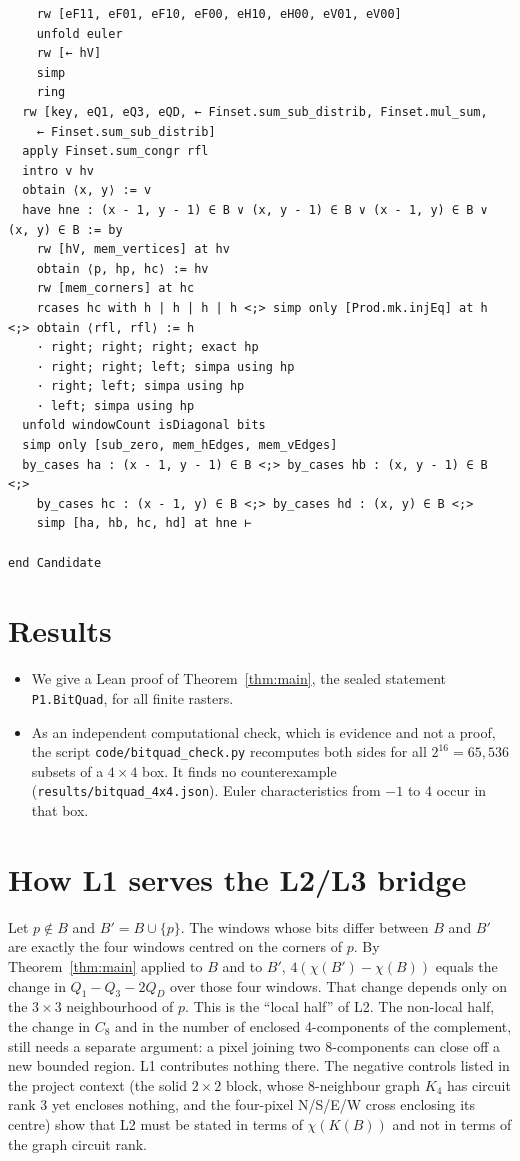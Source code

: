 \documentclass[11pt]{article}
\theoremstyle{definition}
\theoremstyle{remark}
\begin{document}
\begin{lstlisting}
    rw [eF11, eF01, eF10, eF00, eH10, eH00, eV01, eV00]
    unfold euler
    rw [← hV]
    simp
    ring
  rw [key, eQ1, eQ3, eQD, ← Finset.sum_sub_distrib, Finset.mul_sum,
    ← Finset.sum_sub_distrib]
  apply Finset.sum_congr rfl
  intro v hv
  obtain ⟨x, y⟩ := v
  have hne : (x - 1, y - 1) ∈ B ∨ (x, y - 1) ∈ B ∨ (x - 1, y) ∈ B ∨ (x, y) ∈ B := by
    rw [hV, mem_vertices] at hv
    obtain ⟨p, hp, hc⟩ := hv
    rw [mem_corners] at hc
    rcases hc with h | h | h | h <;> simp only [Prod.mk.injEq] at h <;> obtain ⟨rfl, rfl⟩ := h
    · right; right; right; exact hp
    · right; right; left; simpa using hp
    · right; left; simpa using hp
    · left; simpa using hp
  unfold windowCount isDiagonal bits
  simp only [sub_zero, mem_hEdges, mem_vEdges]
  by_cases ha : (x - 1, y - 1) ∈ B <;> by_cases hb : (x, y - 1) ∈ B <;>
    by_cases hc : (x - 1, y) ∈ B <;> by_cases hd : (x, y) ∈ B <;>
    simp [ha, hb, hc, hd] at hne ⊢

end Candidate
\end{lstlisting}

\section{Results}

\begin{itemize}
\item We give a Lean proof of Theorem~\ref{thm:main}, the sealed statement
  \texttt{P1.BitQuad}, for all finite rasters.
\item As an independent computational check, which is evidence and not a
  proof, the script \texttt{code/bitquad\_check.py} recomputes both sides for
  all $2^{16}=65{,}536$ subsets of a $4\times4$ box. It finds no
  counterexample (\texttt{results/bitquad\_4x4.json}). Euler characteristics
  from $-1$ to $4$ occur in that box.
\end{itemize}

\section{How L1 serves the L2/L3 bridge}\label{sec:l1end}

Let $p\notin B$ and $B'=B\cup\{p\}$. The windows whose bits differ between $B$
and $B'$ are exactly the four windows centred on the corners of $p$. By
Theorem~\ref{thm:main} applied to $B$ and to $B'$, $4(\chi(B')-\chi(B))$ equals
the change in $Q_1-Q_3-2Q_D$ over those four windows. That change depends only on the
$3\times3$ neighbourhood of $p$. This is the ``local half'' of L2. The non-local
half, the change in $C_8$ and in the number of enclosed 4-components of the
complement, still needs a separate argument: a pixel joining two
8-components can close off a new bounded region. L1 contributes nothing there.
The negative controls listed in the project context (the solid $2\times2$ block,
whose 8-neighbour graph $K_4$ has circuit rank 3 yet encloses nothing, and the
four-pixel N/S/E/W cross enclosing its centre) show that L2 must be stated
in terms of $\chi(K(B))$ and not in terms of the graph circuit rank.
\end{document}
